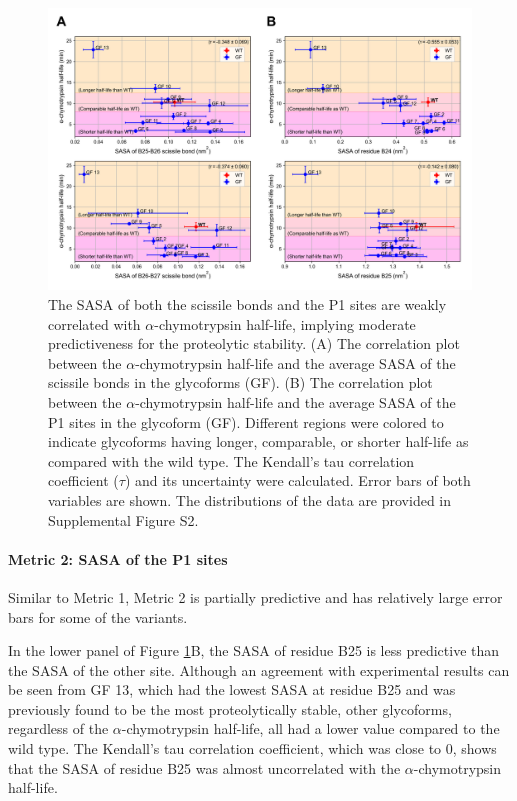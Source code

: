 \documentclass[9pt]{elife}
\begin{document}
\begin{figure}[H]
\centering
\includegraphics[width=\textwidth]{Figures/Fig_SASA_correlation.png}
\caption{The SASA of both the scissile bonds and the P1 sites are weakly correlated with $\alpha$-chymotrypsin half-life, implying moderate predictiveness for the proteolytic stability. (A) The correlation plot between the $\alpha$-chymotrypsin half-life and the average SASA of the scissile bonds in the glycoforms (GF). (B) The correlation plot between the $\alpha$-chymotrypsin half-life and the average SASA of the P1 sites in the glycoform (GF). Different regions were colored to indicate glycoforms having longer, comparable, or shorter half-life as compared with the wild type. The Kendall's tau correlation coefficient ($\tau$) and its uncertainty were calculated. Error bars of both variables are shown. The distributions of the data are provided in Supplemental Figure S2.}
\label{result_sasa}
\end{figure}

\paragraph{Metric 2: SASA of the P1 sites}
Similar to Metric 1, Metric 2 is partially predictive and has relatively large error bars for some of the variants. 

In the lower panel of Figure \ref{result_sasa}B, the SASA of residue B25 is less predictive than the SASA of the other site. Although an agreement with experimental results can be seen from GF 13, which had the lowest SASA at residue B25 and was previously found to be the most proteolytically stable, other glycoforms, regardless of the $\alpha$-chymotrypsin half-life, all had a lower value compared to the wild type. The Kendall's tau correlation coefficient, which was close to 0, shows that the SASA of residue B25 was almost uncorrelated with the $\alpha$-chymotrypsin half-life. 
\end{document}
